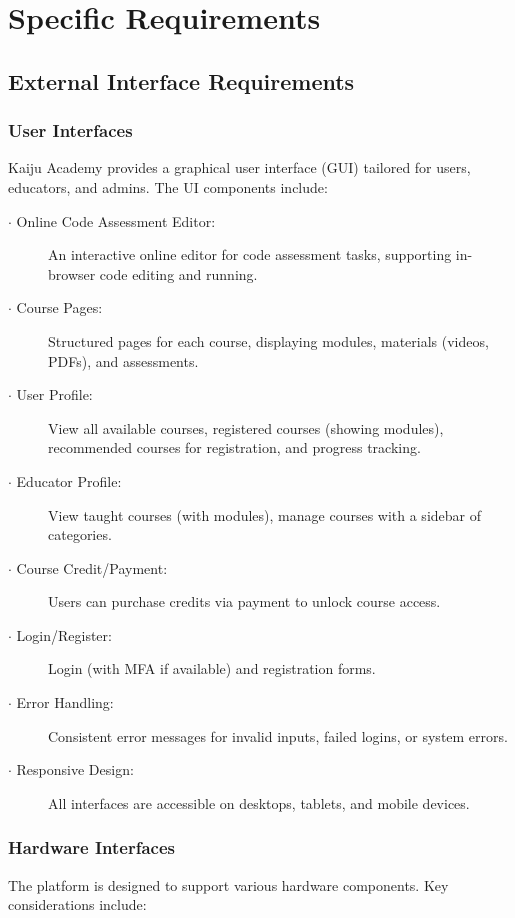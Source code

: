 \documentclass[a4paper, 11pt]{scrreprt}
\begin{document}
\chapter{Specific Requirements}

\section{External Interface Requirements}
\subsection{User Interfaces}

Kaiju Academy provides a graphical user interface (GUI) tailored for users, educators, and admins. The UI components include:

\begin{description}
    \item[$\cdot$ Online Code Assessment Editor:] An interactive online editor for code assessment tasks, supporting in-browser code editing and running.
    \item[$\cdot$ Course Pages:] Structured pages for each course, displaying modules, materials (videos, PDFs), and assessments.
    \item[$\cdot$ User Profile:] View all available courses, registered courses (showing modules), recommended courses for registration, and progress tracking.
    \item[$\cdot$ Educator Profile:] View taught courses (with modules), manage courses with a sidebar of categories.
    \item[$\cdot$ Course Credit/Payment:] Users can purchase credits via payment to unlock course access.
    \item[$\cdot$ Login/Register:] Login (with MFA if available) and registration forms.
    \item[$\cdot$ Error Handling:] Consistent error messages for invalid inputs, failed logins, or system errors.
    \item[$\cdot$ Responsive Design:] All interfaces are accessible on desktops, tablets, and mobile devices.
\end{description}

\subsection{Hardware Interfaces}

The platform is designed to support various hardware components. Key considerations include:
\end{document}
